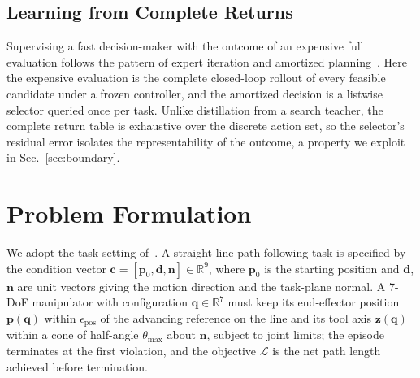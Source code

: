 \documentclass{svproc}
\begin{document}
\subsection{Learning from Complete Returns}
Supervising a fast decision-maker with the outcome of an expensive full
evaluation follows the pattern of expert iteration and amortized
planning~\cite{yuan2026iksel}. Here the expensive evaluation is the complete
closed-loop rollout of every feasible candidate under a frozen controller, and
the amortized decision is a listwise selector queried once per task. Unlike
distillation from a search teacher, the complete return table is exhaustive
over the discrete action set, so the selector's residual error isolates the
representability of the outcome, a property we exploit in
Sec.~\ref{sec:boundary}.

\section{Problem Formulation}
\label{sec:formulation}
We adopt the task setting of~\cite{yuan2026extreme}. A straight-line
path-following task is specified by the condition vector
$\mathbf{c} = [\mathbf{p}_{0}, \mathbf{d}, \mathbf{n}] \in \mathbb{R}^{9}$,
where $\mathbf{p}_{0}$ is the starting position and $\mathbf{d}$, $\mathbf{n}$
are unit vectors giving the motion direction and the task-plane normal. A
7-DoF manipulator with configuration $\mathbf{q}\in\mathbb{R}^{7}$ must keep
its end-effector position $\mathbf{p}(\mathbf{q})$ within
$\epsilon_{\text{pos}}$ of the advancing reference on the line and its tool
axis $\mathbf{z}(\mathbf{q})$ within a cone of half-angle $\theta_{\max}$
about $\mathbf{n}$, subject to joint limits; the episode terminates at the
first violation, and the objective $\mathcal{L}$ is the net path length
achieved before termination.
\end{document}
